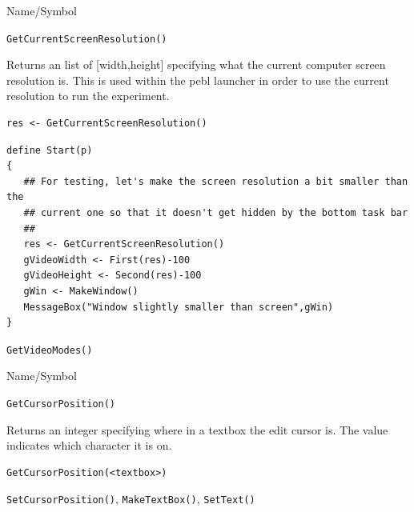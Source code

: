 \begin{desc}{Name/Symbol}
\item[Name/Symbol]	\verb+GetCurrentScreenResolution()+

\item[Description]	Returns an list of [width,height] specifying what the 
current computer screen resolution is.  This is used within the pebl launcher in order
to use the current resolution to run the experiment.

\item[Usage]
\begin{verbatim}
res <- GetCurrentScreenResolution()
\end{verbatim}

\item[Example]	

\begin{verbatim}
define Start(p)
{
   ## For testing, let's make the screen resolution a bit smaller than the 
   ## current one so that it doesn't get hidden by the bottom task bar
   ##
   res <- GetCurrentScreenResolution()
   gVideoWidth <- First(res)-100
   gVideoHeight <- Second(res)-100
   gWin <- MakeWindow()
   MessageBox("Window slightly smaller than screen",gWin)
}
\end{verbatim}


\item[See Also]	\verb+GetVideoModes()+
\end{desc}


\begin{desc}{Name/Symbol}
\item[Name/Symbol]	\verb+GetCursorPosition()+

\item[Description]	Returns an integer specifying where in a textbox the edit cursor is.  The value indicates which character it is on.

\item[Usage]
\begin{verbatim}
GetCursorPosition(<textbox>)
\end{verbatim}

\item[Example]	

\item[See Also]	\verb+SetCursorPosition()+, \verb+MakeTextBox()+, \verb+SetText()+
\end{desc}

